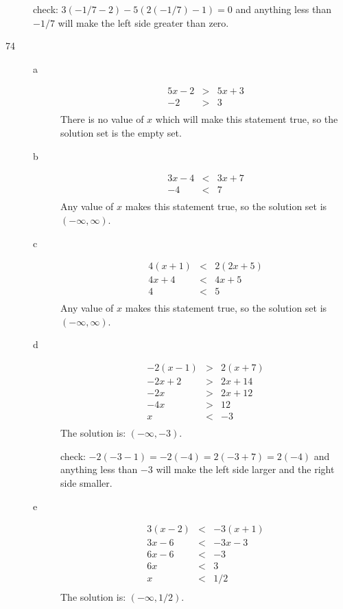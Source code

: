 \documentclass[fleqn,addpoints]{exam}
\begin{document}
\begin{description}
check: \( 3(-1/7 - 2) - 5(2(-1/7) - 1) = 0 \) and anything less than $-1/7$ will make the left side greater than zero.

\item[74]
  \begin{description}
  \item[a]
  \begin{eqnarray*}
    5x - 2 &>& 5x + 3 \\
    -2 &>& 3 \\
  \end{eqnarray*}
There is no value of $x$ which will make this statement true, so the solution set is the empty set.

  \item[b]
  \begin{eqnarray*}
    3x - 4 &<& 3x + 7 \\
    -4 &<& 7 \\
  \end{eqnarray*}
Any value of $x$ makes this statement true, so the solution set is $(-\infty, \infty)$.

  \item[c]
  \begin{eqnarray*}
    4(x + 1) &<& 2(2x + 5) \\
    4x + 4 &<& 4x + 5 \\
    4 &<& 5 \\
  \end{eqnarray*}
Any value of $x$ makes this statement true, so the solution set is $(-\infty, \infty)$.

  \item[d]
  \begin{eqnarray*}
    -2(x - 1) &>& 2(x + 7) \\
    -2x + 2 &>& 2x + 14\\
    -2x &>& 2x + 12\\
    -4x &>& 12\\
    x &<& -3\\
  \end{eqnarray*}
The solution is: $(-\infty, -3)$.

check: \( -2(-3 - 1) = -2(-4) = 2(-3 + 7) = 2(-4)\) and anything less than $-3$ will make the left side larger and the right side smaller.

  \item[e]
  \begin{eqnarray*}
    3(x - 2) &<& -3(x + 1) \\
    3x - 6 &<& -3x - 3 \\
    6x - 6 &<& - 3 \\
    6x &<& 3 \\
    x &<& 1/2 \\
  \end{eqnarray*}
The solution is: $(-\infty, 1/2)$.


\end{description}
\end{description}
\end{document}
